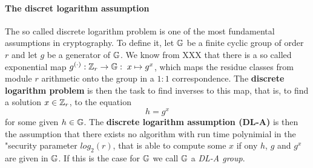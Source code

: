 \paragraph{The discret logarithm assumption} The so called discrete logarithm problem is one of the most fundamental assumptions in cryptography. To define it, let $\mathbb{G}$ be a finite cyclic group of order $r$ and let $g$ be a generator of $\mathbb{G}$.  We know from XXX that there is a so called exponential map 
$g^{(\cdot)}: \mathbb{Z}_r \to \mathbb{G}:\; x\mapsto g^x$, which maps the residue classes from module $r$ arithmetic onto the group in a $1:1$ correspondence. The \textbf{discrete logarithm problem} is then the task to find inverses to this map, that is, to find a solution $x\in\mathbb{Z}_r$, to the equation
\begin{equation}
h = g^x
\end{equation}
for some given $h\in\mathbb{G}$. The \textbf{discrete logarithm assumption (DL-A)} is then the assumption that there exists no algorithm with run time polynimial in the "security parameter $log_2(r)$, that is able to compute some $x$ if ony $h$, $g$ and $g^x$ are given in $\mathbb{G}$. If this is the case for $\mathbb{G}$ we call $\mathbb{G}$ a \textit{DL-A group}.

